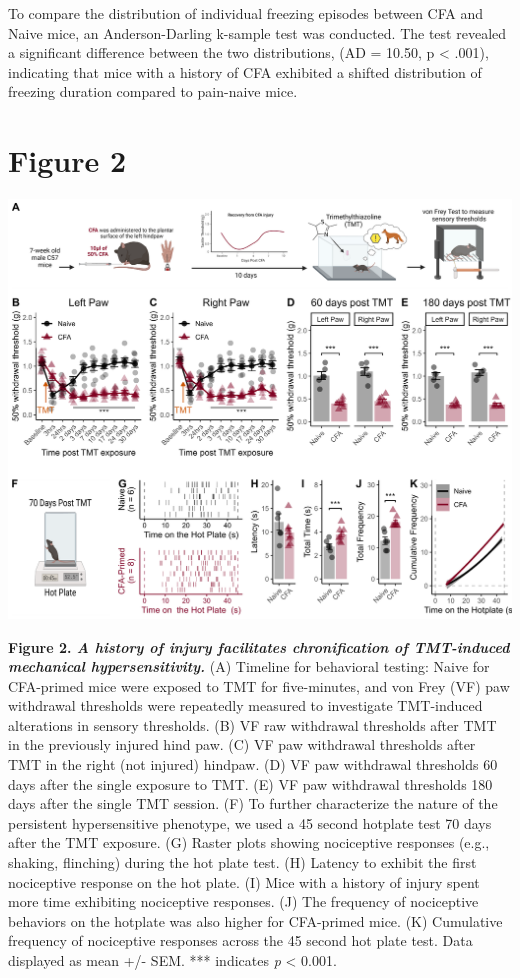 \documentclass[
]{book}
\begin{document}
To compare the distribution of individual freezing episodes between CFA and Naive mice, an Anderson-Darling k-sample test was conducted. The test revealed a significant difference between the two distributions, (AD = 10.50, p \textless{} .001), indicating that mice with a history of CFA exhibited a shifted distribution of freezing duration compared to pain-naive mice.

\chapter*{Figure 2}\label{figure-2}

\includegraphics[width=75in]{Figs/2_TMT_VF}

\textbf{Figure 2. \emph{A history of injury facilitates chronification of TMT-induced mechanical hypersensitivity.}} (A) Timeline for behavioral testing: Naive for CFA-primed mice were exposed to TMT for five-minutes, and von Frey (VF) paw withdrawal thresholds were repeatedly measured to investigate TMT-induced alterations in sensory thresholds. (B) VF raw withdrawal thresholds after TMT in the previously injured hind paw. (C) VF paw withdrawal thresholds after TMT in the right (not injured) hindpaw. (D) VF paw withdrawal thresholds 60 days after the single exposure to TMT. (E) VF paw withdrawal thresholds 180 days after the single TMT session. (F) To further characterize the nature of the persistent hypersensitive phenotype, we used a 45 second hotplate test 70 days after the TMT exposure. (G) Raster plots showing nociceptive responses (e.g., shaking, flinching) during the hot plate test. (H) Latency to exhibit the first nociceptive response on the hot plate. (I) Mice with a history of injury spent more time exhibiting nociceptive responses. (J) The frequency of nociceptive behaviors on the hotplate was also higher for CFA-primed mice. (K) Cumulative frequency of nociceptive responses across the 45 second hot plate test. Data displayed as mean +/- SEM. *** indicates \emph{p} \textless{} 0.001.
\end{document}

